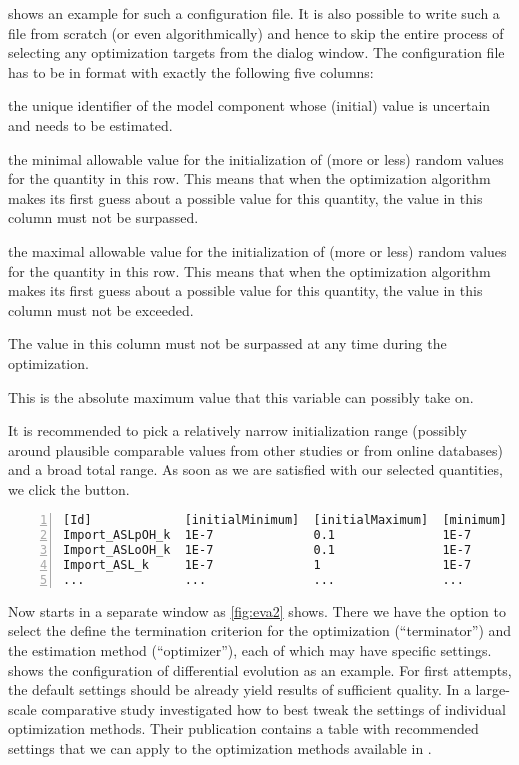  shows an example for such a configuration file.
It is also possible to write such a file from scratch (or even algorithmically) and hence to skip the entire process of selecting any optimization targets from the dialog window.
The configuration file has to be in \CSV format with exactly the following five columns:
\begin{description}
  \renewcommand{\makelabel}[1]{[\texttt{#1}]}
  \item[Id] the unique identifier of the model component whose (initial) value is uncertain and needs to be estimated.
  \item[initialMinimum] the minimal allowable value for the initialization of (more or less) random values for the quantity in this row.
  This means that when the optimization algorithm makes its first guess about a possible value for this quantity, the value in this column must not be surpassed.
  \item[initialMaximum]  the maximal allowable value for the initialization of (more or less) random values for the quantity in this row.
  This means that when the optimization algorithm makes its first guess about a possible value for this quantity, the value in this column must not be exceeded.
  \item[minimum] The value in this column must not be surpassed at any time during the optimization.
  \item[maximum] This is the absolute maximum value that this variable can possibly take on.
\end{description}
It is recommended to pick a relatively narrow initialization range (possibly around plausible comparable values from other studies or from online databases) and a broad total range.
As soon as we are satisfied with our selected quantities, we click the  button.
\begin{lstlisting}[caption={Input file example for parameter estimation file},label={lst:input:estimation},numbers=left,captionpos=t,float=h]
[Id]             [initialMinimum]  [initialMaximum]  [minimum]  [maximum]
Import_ASLpOH_k  1E-7              0.1               1E-7       0.1	
Import_ASLoOH_k  1E-7              0.1               1E-7       0.1	
Import_ASL_k     1E-7              1                 1E-7       1	
...              ...               ...               ...        ...
\end{lstlisting}

Now \EvA starts in a separate window as \cref{fig:eva2} shows.
There we have the option to select the define the termination criterion for the optimization (``terminator'') and the estimation method (``optimizer''), each of which may have specific settings.
 shows the configuration of differential evolution \citep{Storn96Usage} as an example.
For first attempts, the default settings should be already yield results of sufficient quality.
In a large-scale comparative study \citet{Draeger2009a} investigated how to best tweak the settings of individual optimization methods.
Their publication contains a table with recommended settings that we can apply to the optimization methods available in \EvA.


